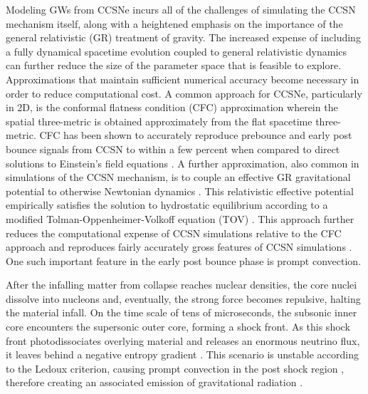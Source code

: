 \documentclass[twocolumn,times]{aastex62}  %
\begin{document}
Modeling GWs from CCSNe incurs all of the challenges of simulating the CCSN mechanism itself, along with a heightened emphasis on the importance of the general relativistic (GR) treatment of gravity. 
The increased expense of including a fully dynamical spacetime evolution coupled to general relativistic dynamics \citep[cf.][]{ott:2009, ott:2012} can further reduce the size of the parameter space that is feasible to explore. 
Approximations that maintain sufficient numerical accuracy become necessary in order to reduce computational cost.  
A common approach for CCSNe, particularly in 2D, is the conformal flatness condition (CFC) approximation wherein the spatial three-metric is obtained approximately from the flat spacetime three-metric.
CFC has been shown to accurately reproduce prebounce and early post bounce signals from CCSN to within a few percent when compared to direct solutions to Einstein's field equations  \citep{ott:2007}.
A further approximation, also common in simulations of the CCSN mechanism, is to couple an effective GR gravitational potential to otherwise Newtonian dynamics \citep{rampp:2002, marek:2006, bruenn:2016, oconnor:2018, morozova:2018}.  
This relativistic effective potential empirically satisfies the solution to hydrostatic equilibrium according to a modified Tolman-Oppenheimer-Volkoff equation (TOV) \citep{rampp:2002, marek:2006}.
This approach further reduces the computational expense of CCSN simulations relative to the CFC approach and reproduces fairly accurately gross features of CCSN simulations \citep{marek:2006, muller:2012,oconnor:2018}.  One such important feature in the early post bounce phase is prompt convection.

After the infalling matter from collapse reaches nuclear densities, the core nuclei dissolve into nucleons and, eventually, the strong force becomes repulsive, halting the material infall.  On the time scale of tens of microseconds, the subsonic inner core encounters the supersonic outer core, forming a shock front.  As this shock front photodissociates overlying material and releases an enormous neutrino flux, it leaves behind a negative entropy gradient \citep{mazurek:1982,bruenn:1985,bruenn:1989}.  This scenario is unstable according to the Ledoux criterion, causing prompt convection in the post shock region \citep{burrows:1992}, therefore creating an associated emission of gravitational radiation \citep{marek:2009b,ott:2009}.  
\end{document}

